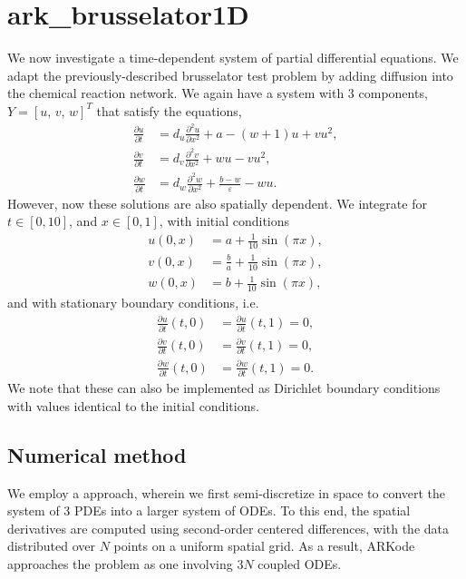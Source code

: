\documentclass[letterpaper,10pt,english]{sphinxmanual}
\begin{document}
\section{ark\_brusselator1D}
\label{\detokenize{c_serial:id18}}\label{\detokenize{c_serial:ark-brusselator1d}}
We now investigate a time-dependent system of partial differential
equations.  We adapt the previously-described brusselator test problem
by adding diffusion into the chemical reaction network.  We again have
a system with 3 components, \(Y = [u,\, v,\, w]^T\) that satisfy
the equations,
\begin{equation*}
\begin{split}\frac{\partial u}{\partial t} &= d_u \frac{\partial^2 u}{\partial
   x^2} + a - (w+1) u + v u^2, \\
\frac{\partial v}{\partial t} &= d_v \frac{\partial^2 v}{\partial
   x^2} + w u - v u^2, \\
\frac{\partial w}{\partial t} &= d_w \frac{\partial^2 w}{\partial
   x^2} + \frac{b-w}{\varepsilon} - w u.\end{split}
\end{equation*}
However, now these solutions are also spatially dependent.  We
integrate for \(t \in [0, 10]\), and \(x \in [0, 1]\), with
initial conditions
\begin{equation*}
\begin{split}u(0,x) &=  a + \frac{1}{10} \sin(\pi x),\\
v(0,x) &= \frac{b}{a} + \frac{1}{10}\sin(\pi x),\\
w(0,x) &=  b + \frac{1}{10}\sin(\pi x),\end{split}
\end{equation*}
and with stationary boundary conditions, i.e.
\begin{equation*}
\begin{split}\frac{\partial u}{\partial t}(t,0) &= \frac{\partial u}{\partial t}(t,1) = 0,\\
\frac{\partial v}{\partial t}(t,0) &= \frac{\partial v}{\partial t}(t,1) = 0,\\
\frac{\partial w}{\partial t}(t,0) &= \frac{\partial w}{\partial t}(t,1) = 0.\end{split}
\end{equation*}
We note that these can also be implemented as Dirichlet boundary
conditions with values identical to the initial conditions.


\subsection{Numerical method}
\label{\detokenize{c_serial:id19}}
We employ a  approach, wherein we first
semi-discretize in space to convert the system of 3 PDEs into a larger
system of ODEs.  To this end, the spatial derivatives are computed
using second-order centered differences, with the data distributed
over \(N\) points on a uniform spatial grid.  As a result, ARKode
approaches the problem as one involving \(3N\) coupled ODEs.
\end{document}
